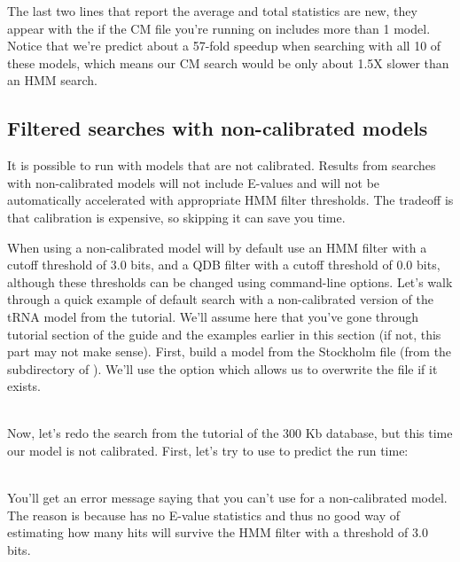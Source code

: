 The last two lines that report the average and total statistics are
new, they appear with the  if the
CM file you're running   on includes more than 1 model. 
Notice that we're predict about a 57-fold speedup when searching with
all 10 of these models, which means our CM search would be only about
1.5X slower than an HMM search.

\subsection{Filtered searches with non-calibrated models}

It is possible to run  with models that are not
calibrated. Results from searches with non-calibrated models will not
include E-values and will not be automatically accelerated with
appropriate HMM filter thresholds. The tradeoff is that calibration is
expensive, so skipping it can save you time.  

When using a non-calibrated model  will by default use
an HMM filter with a cutoff threshold of $3.0$ bits, and a QDB filter
with a cutoff threshold of $0.0$ bits, although these thresholds can
be changed using command-line options. Let's walk through a quick
example of default search with a non-calibrated version of the tRNA model
from the tutorial. We'll assume here that you've gone through tutorial
section of the guide and the examples earlier in this section (if not,
this part may not make sense).  First, build a model from the
 Stockholm file (from the 
subdirectory of ). We'll use the  option
which allows us to overwrite the file  if it exists.

\\

Now, let's redo the search from the tutorial of the 300 Kb database,
but this time our model is not calibrated. First, let's try to use
 to predict the run time: 

\\

You'll get an error message saying that you can't use
 for a non-calibrated model. The reason is because
 has no E-value statistics and thus no good way of
estimating how many hits will survive the HMM filter with a threshold
of $3.0$ bits. 

